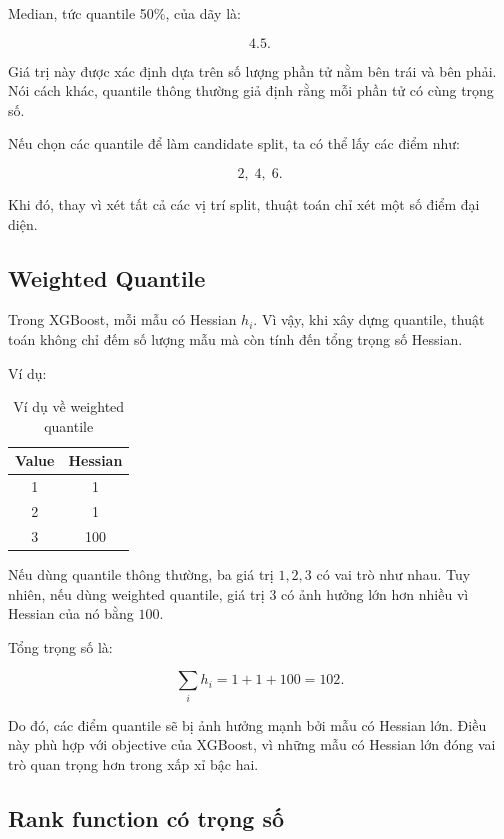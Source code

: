 Median, tức quantile 50\%, của dãy là:

\[
4.5.
\]

Giá trị này được xác định dựa trên số lượng phần tử nằm bên trái và bên phải. Nói cách khác, quantile thông thường giả định rằng mỗi phần tử có cùng trọng số.

Nếu chọn các quantile để làm candidate split, ta có thể lấy các điểm như:

\[
2,\;4,\;6.
\]

Khi đó, thay vì xét tất cả các vị trí split, thuật toán chỉ xét một số điểm đại diện.

\subsection{Weighted Quantile}

Trong XGBoost, mỗi mẫu có Hessian $h_i$. Vì vậy, khi xây dựng quantile, thuật toán không chỉ đếm số lượng mẫu mà còn tính đến tổng trọng số Hessian.

Ví dụ:

\begin{table}[htbp]
    \centering
    \caption{Ví dụ về weighted quantile}
    \label{tab:weighted_quantile_example}
    \begin{tabular}{cc}
        \toprule
        \textbf{Value} & \textbf{Hessian} \\
        \midrule
        1 & 1 \\
        2 & 1 \\
        3 & 100 \\
        \bottomrule
    \end{tabular}
\end{table}

Nếu dùng quantile thông thường, ba giá trị $1,2,3$ có vai trò như nhau. Tuy nhiên, nếu dùng weighted quantile, giá trị $3$ có ảnh hưởng lớn hơn nhiều vì Hessian của nó bằng $100$.

Tổng trọng số là:

\[
\sum_i h_i = 1 + 1 + 100 = 102.
\]

Do đó, các điểm quantile sẽ bị ảnh hưởng mạnh bởi mẫu có Hessian lớn. Điều này phù hợp với objective của XGBoost, vì những mẫu có Hessian lớn đóng vai trò quan trọng hơn trong xấp xỉ bậc hai.

\subsection{Rank function có trọng số}

